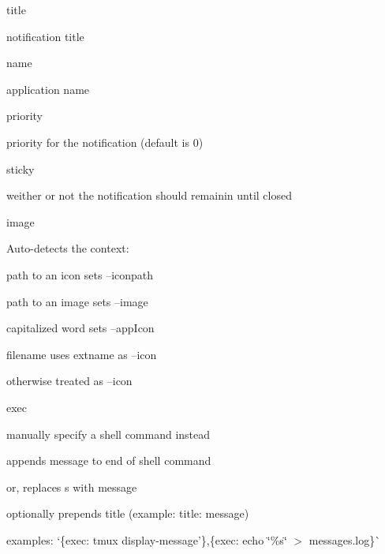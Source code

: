 \begin{DoxyItemize}
\item title
\begin{DoxyItemize}
\item notification title
\end{DoxyItemize}
\item name
\begin{DoxyItemize}
\item application name
\end{DoxyItemize}
\item priority
\begin{DoxyItemize}
\item priority for the notification (default is 0)
\end{DoxyItemize}
\item sticky
\begin{DoxyItemize}
\item weither or not the notification should remainin until closed
\end{DoxyItemize}
\item image
\begin{DoxyItemize}
\item Auto-\/detects the context\+:
\begin{DoxyItemize}
\item path to an icon sets --iconpath
\item path to an image sets --image
\item capitalized word sets --app\+Icon
\item filename uses extname as --icon
\item otherwise treated as --icon
\end{DoxyItemize}
\end{DoxyItemize}
\item exec
\begin{DoxyItemize}
\item manually specify a shell command instead
\begin{DoxyItemize}
\item appends message to end of shell command
\item or, replaces {\ttfamily s} with message
\item optionally prepends title (example\+: {\ttfamily title\+: message})
\item examples\+: `\{exec\+: \textquotesingle{}tmux display-\/message'\}{\ttfamily ,}\{exec\+: \textquotesingle{}echo \char`\"{}\%s\char`\"{} $>$ messages.\+log\}\`{}
\end{DoxyItemize}
\end{DoxyItemize}
\end{DoxyItemize}

